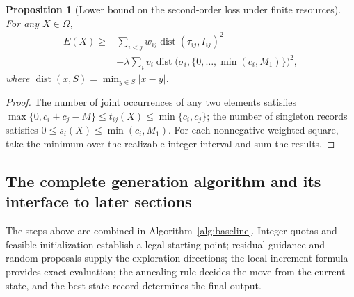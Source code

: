 \documentclass[11pt,a4paper]{article}
\numberwithin{equation}{section}
\newtheorem{proposition}{Proposition}[section]
\theoremstyle{definition}
\numberwithin{algorithm}{section}
\begin{document}
\begin{proposition}[Lower bound on the second-order loss under finite resources]
\label{prop:baseline-lower-bound}
For any $X\in\Omega$,
\begin{equation}
\begin{aligned}
E(X)\ge {}&
\sum_{i<j}w_{ij}\operatorname{dist}(\tau_{ij},I_{ij})^2\\
&+\lambda\sum_i v_i
\operatorname{dist}\bigl(\sigma_i,
\{0,\ldots,\min(c_i,M_1)\}\bigr)^2,
\end{aligned}
\label{eq:baseline-lower-bound}
\end{equation}
where $\operatorname{dist}(x,S)=\min_{y\in S}|x-y|$.
\end{proposition}
\begin{proof}
The number of joint occurrences of any two elements satisfies
$\max\{0,c_i+c_j-M\}\le t_{ij}(X)\le\min\{c_i,c_j\}$;
the number of singleton records satisfies
$0\le s_i(X)\le\min(c_i,M_1)$.
For each nonnegative weighted square, take the minimum over the realizable integer interval
and sum the results.
\end{proof}

\subsection{The complete generation algorithm and its interface to later sections}\label{subsec:baseline-algorithm}

The steps above are combined in Algorithm~\ref{alg:baseline}.
Integer quotas and feasible initialization establish a legal starting point;
residual guidance and random proposals supply the exploration directions;
the local increment formula provides exact evaluation;
the annealing rule decides the move from the current state, and the best-state record
determines the final output.
\end{document}
